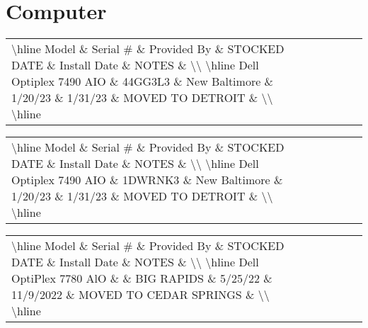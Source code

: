 \documentclass{article}%
\begin{document}
%
\section{Computer}%
\label{sec:Computer}%
\begin{tabularx}{\textwidth}{|X|X|X|X|X|X|X|}%
\textbackslash{}hline%
Model \& Serial \# \& Provided By \& STOCKED DATE \& Install Date \& NOTES \&  \textbackslash{}\textbackslash{}%
\textbackslash{}hline%
Dell Optiplex 7490 AIO \& 44GG3L3 \& New Baltimore \& 1/20/23 \& 1/31/23 \& MOVED TO DETROIT \&  \textbackslash{}\textbackslash{}%
\textbackslash{}hline%
\end{tabularx}%
\begin{tabularx}{\textwidth}{|X|X|X|X|X|X|X|}%
\textbackslash{}hline%
Model \& Serial \# \& Provided By \& STOCKED DATE \& Install Date \& NOTES \&  \textbackslash{}\textbackslash{}%
\textbackslash{}hline%
Dell Optiplex 7490 AIO \& 1DWRNK3 \& New Baltimore \& 1/20/23 \& 1/31/23 \& MOVED TO DETROIT \&  \textbackslash{}\textbackslash{}%
\textbackslash{}hline%
\end{tabularx}%
\begin{tabularx}{\textwidth}{|X|X|X|X|X|X|X|}%
\textbackslash{}hline%
Model \& Serial \# \& Provided By \& STOCKED DATE \& Install Date \& NOTES \&  \textbackslash{}\textbackslash{}%
\textbackslash{}hline%
Dell OptiPlex 7780 AlO \&  \& BIG RAPIDS \& 5/25/22 \& 11/9/2022 \& MOVED TO CEDAR SPRINGS \&  \textbackslash{}\textbackslash{}%
\textbackslash{}hline%
\end{tabularx}

%
\end{document}
